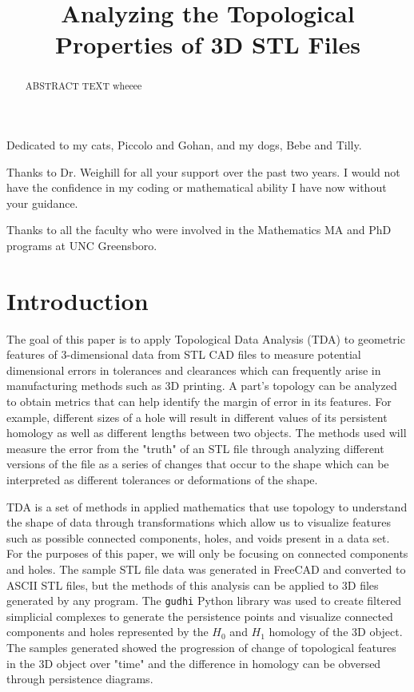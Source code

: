 \documentclass[ma]{uncgdissertationexp}
\title{Analyzing the Topological Properties of 3D STL Files}
\theoremstyle{plain}
\theoremstyle{definition}
\theoremstyle{remark}
\begin{document}
\frontmatter      %
\begin{abstract}
ABSTRACT TEXT wheeee
\end{abstract}
\maketitlepage  
\makecopyrightpage
\begin{dedication}
Dedicated to my cats, Piccolo and Gohan, and my dogs, Bebe and Tilly.
\end{dedication}
\makeapprovalpage
\begin{acknowledgments}
\par Thanks to Dr. Weighill for all your support over the past two years. I would not have the confidence in my coding or mathematical ability I have now without your guidance.
\par Thanks to all the faculty who were involved in the Mathematics MA and PhD programs at UNC Greensboro. 
\end{acknowledgments}
\tableofcontents
\listoftables
\listoffigures
\mainmatter

\chapter{Introduction}

\par The goal of this paper is to apply Topological Data Analysis (TDA) to geometric features of 3-dimensional data from STL CAD files to measure potential dimensional errors in tolerances and clearances which can frequently arise in manufacturing methods such as 3D printing. A part's topology can be analyzed to obtain metrics that can help identify the margin of error in its features. For example, different sizes of a hole will result in different values of its persistent homology as well as different lengths between two objects. The methods used will measure the error from the "truth" of an STL file through analyzing different versions of the file as a series of changes that occur to the shape which can be interpreted as different tolerances or deformations of the shape.
\par TDA is a set of methods in applied mathematics that use topology to understand the shape of data through transformations which allow us to visualize features such as possible connected components, holes, and voids present in a data set. For the purposes of this paper, we will only be focusing on connected components and holes. The sample STL file data was generated in FreeCAD and converted to ASCII STL files, but the methods of this analysis can be applied to 3D files generated by any program. The \verb"gudhi" Python library was used to create filtered simplicial complexes to generate the persistence points and visualize connected components and holes represented by the $H_0$ and $H_1$ homology of the 3D object. The samples generated showed the progression of change of topological features in the 3D object over "time" and the difference in homology can be obversed through persistence diagrams.
\end{document}
